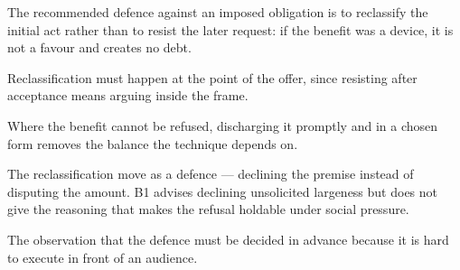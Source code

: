 

\begin{distilled}
  \item The recommended defence against an imposed obligation is to reclassify the initial act rather than to resist the later request: if the benefit was a device, it is not a favour and creates no debt.
  \item Reclassification must happen at the point of the offer, since resisting after acceptance means arguing inside the frame.
  \item Where the benefit cannot be refused, discharging it promptly and in a chosen form removes the balance the technique depends on.
\end{distilled}

\begin{unique}
  \item The reclassification move as a defence --- declining the premise instead of disputing the amount. B1 advises declining unsolicited largeness but does not give the reasoning that makes the refusal holdable under social pressure.
  \item The observation that the defence must be decided in advance because it is hard to execute in front of an audience.
\end{unique}
